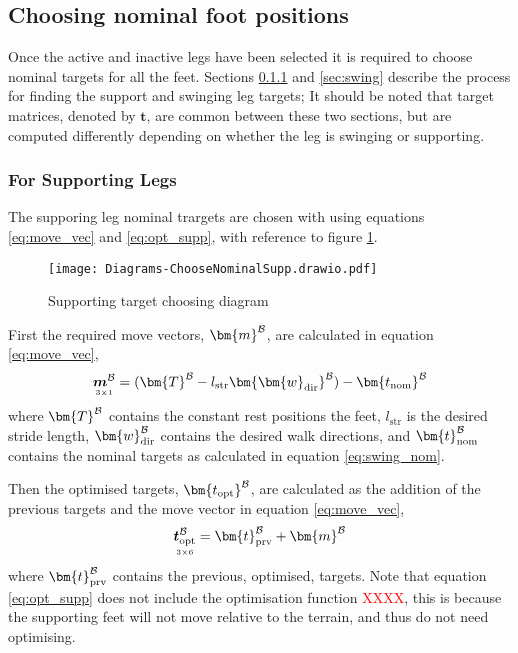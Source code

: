            \newpage
        \subsection{Choosing nominal foot positions}    
            Once the active and inactive legs have been selected it is required to choose nominal targets for all the feet. Sections \ref{sec:support} and \ref{sec:swing}
            describe the process for finding the support and swinging leg targets; It should be noted that target matrices, denoted by \(\bm{t}\), are common between these two sections, but are computed
            differently depending on whether the leg is swinging or supporting.
                
            \subsubsection{For Supporting Legs} \label{sec:support}
                The supporing leg nominal trargets are chosen with using equations \ref{eq:move_vec} and \ref{eq:opt_supp}, with reference
                to figure \ref{fig:supp_targ}.
                \begin{figure}[h]
                    \centering
                    \texttt{[image: Diagrams-ChooseNominalSupp.drawio.pdf]}
                    \caption{Supporting target choosing diagram} 
                    \label{fig:supp_targ}
                \end{figure}

                \noindent
                First the required move vectors, \(\bm{m} ^\fbody\), are calculated in equation \ref{eq:move_vec},
                \begin{equation}\label{eq:move_vec}
                    \mdim{\boldsymbol{m}^\fbody}{3}{1} =  (\bm{T}^\fbody - l_\text{str} \bm{\bm{w}_\text{dir}}^\fbody) - \bm{t_\text{nom}}^\fbody
                \end{equation}
                where \(\bm{T}^\fbody\) contains the constant rest positions the feet, \(l_\text{str}\) is the desired stride length, \(\bm{w}_\text{dir}^\fbody\)
                contains the desired walk directions, and \(\bm{t}_\text{nom} ^\fbody\) contains the nominal targets as calculated in
                equation \ref{eq:swing_nom}.

                Then the optimised targets, \(\bm{t_\text{opt}} ^\fbody\), are calculated as the addition of the previous targets and the move vector in equation \ref{eq:move_vec},
                \begin{equation} \label{eq:opt_supp}
                    \mdim{\boldsymbol{t}_\text{opt}^\fbody}{3}{6} = \bm{t}_\text{prv}^\fbody + \bm{m}^\fbody
                \end{equation}
                where \(\bm{t}_\text{prv}^\fbody\) contains the previous, optimised, targets. Note that equation \ref{eq:opt_supp} does not include the optimisation
                function \textcolor{red}{XXXX}, this is because the supporting feet will not move relative to the terrain, and thus do not need optimising.

